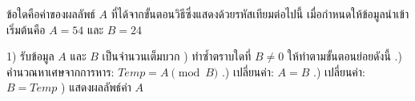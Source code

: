 \question ข้อใดคือค่าของผลลัพธ์ $A$ ที่ได้จากขั้นตอนวิธีซึ่งแสดงด้วยรหัสเทียมต่อไปนี้ เมื่อกำหนดให้ข้อมูลนำเข้าเริ่มต้นคือ $A = 54$ และ $B = 24$
\newline
\begin{pseudocode}
1) รับข้อมูล $A$ และ $B$ เป็นจำนวนเต็มบวก
) ทำซ้ำตราบใดที่ $B \neq 0$ ให้ทำตามขั้นตอนย่อยดังนี้
\newline
.) คำนวณหาเศษจากการหาร: $Temp = A \pmod B$
\newline
.) เปลี่ยนค่า: $A = B$
\newline
.) เปลี่ยนค่า: $B = Temp$
) แสดงผลลัพธ์ค่า $A$
\end{pseudocode}
